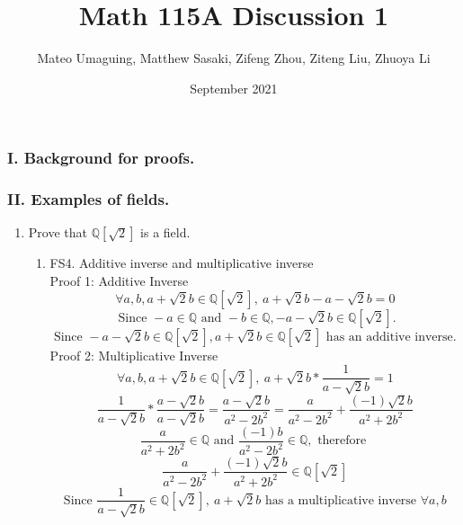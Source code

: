 \documentclass{article}
\title{Math 115A Discussion 1}
\author{Mateo Umaguing, Matthew Sasaki, Zifeng Zhou, Ziteng Liu, Zhuoya Li}
\date{September 2021}
\begin{document}
\maketitle

\subsubsection*{ I. \textbf{Background for proofs.}}

\subsubsection*{ II. \textbf{Examples of fields.}}
\begin{enumerate}
    \item Prove that $\mathbb{Q}[\sqrt{2}]$ is a field.
    \begin{enumerate}
        \item FS4. Additive inverse and multiplicative inverse \\
        Proof 1: Additive Inverse
        \begin{displaymath}
            \forall a, b, a + \sqrt{2} b \in \mathbb{Q}[\sqrt{2}], \ 
            a + \sqrt{2}b - a - \sqrt{2}b = 0
        \end{displaymath}
        \begin{displaymath}
            \textrm{ Since } -a \in \mathbb{Q} \textrm{ and } -b \in \mathbb{Q},
            -a - \sqrt{2}b \in \mathbb{Q}[\sqrt{2}].
        \end{displaymath}
        \begin{displaymath}
            \textrm{Since } -a - \sqrt{2}b \in \mathbb{Q}[\sqrt{2}],
            a + \sqrt{2} b \in \mathbb{Q}[\sqrt{2}] \textrm{ has an additive inverse.}
        \end{displaymath}
        Proof 2: Multiplicative Inverse
        \begin{displaymath}
            \forall a, b, a + \sqrt{2} b \in \mathbb{Q}[\sqrt{2}], \ 
            a + \sqrt{2}b * \frac{1}{a - \sqrt{2}b} = 1
        \end{displaymath}
        \begin{displaymath}
            \frac{1}{a - \sqrt{2}b} * \frac{a - \sqrt{2}b}{a - \sqrt{2}b} = \frac{a - \sqrt{2}b}{a^2 - 2b^2} = \frac{a}{a^2 - 2b^2} + \frac{(-1)\sqrt{2}b}{a^2 + 2b^2}
        \end{displaymath}
        \begin{displaymath}
            \frac{a}{a^2 + 2b^2} \in \mathbb{Q} \textrm{ and } \frac{(-1)b}{a^2 - 2b^2} \in \mathbb{Q}, \textrm{ therefore }
        \end{displaymath}
        \begin{displaymath}
            \frac{a}{a^2 - 2b^2} + \frac{(-1)\sqrt{2}b}{a^2 + 2b^2} \in \mathbb{Q}[\sqrt{2}]
        \end{displaymath}
        \begin{displaymath}
            \textrm{Since } \frac{1}{a - \sqrt{2}b} \in \mathbb{Q}[\sqrt{2}], \ 
            a + \sqrt{2}b \textrm{ has a multiplicative inverse } \forall a,b
        \end{displaymath}
        

\end{enumerate}
\end{enumerate}
\end{document}
